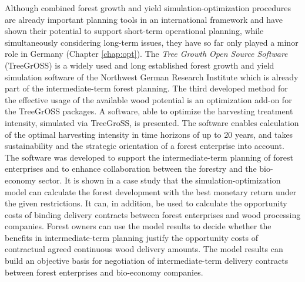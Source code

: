 Although combined forest growth and yield si\-mu\-la\-tion-op\-ti\-mi\-za\-tion procedures are already important planning tools in an international framework and have shown their potential to support short-term operational planning, while simultaneously considering long-term issues, they have so far only played a minor role in Germany (Chapter \ref{chap:opt}). The \textit{Tree Growth Open Source Software} (TreeGrOSS) is a widely used and long established forest growth and yield simulation software of the Northwest German Research Institute which is already part of the intermediate-term forest planning. The third developed method for the effective usage of the available wood potential is an optimization add-on for the TreeGrOSS packages. A software, able to optimize the harvesting treatment intensity, simulated via TreeGroSS, is presented. The software enables calculation of the optimal harvesting intensity in time horizons of up to 20 years, and takes sustainability and the strategic orientation of a forest enterprise into account. The software was developed to support the intermediate-term planning of forest enterprises and to enhance collaboration between the forestry and the bio-economy sector. It is shown in a case study that the si\-mu\-la\-tion-op\-ti\-mi\-za\-tion model can calculate the forest development with the best monetary return under the given restrictions. It can, in addition, be used to calculate the opportunity costs of binding delivery contracts between forest enterprises and wood processing companies. Forest owners can use the model results to decide whether the benefits in intermediate-term planning justify the opportunity costs of contractual agreed continuous wood delivery amounts. The model results can build an objective basis for negotiation of intermediate-term delivery contracts between forest enterprises and bio-economy companies.
